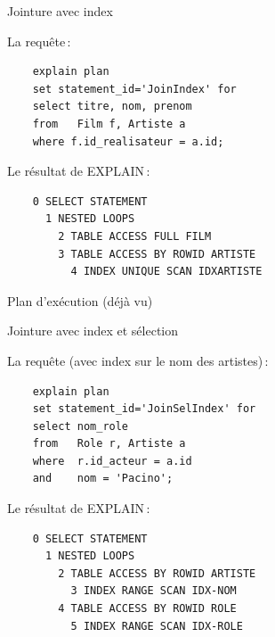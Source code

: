 \begin{frame}[fragile]{Jointure avec index}

La requête\,:

\begin{verbatim}
    explain plan 
    set statement_id='JoinIndex' for
    select titre, nom, prenom
    from   Film f, Artiste a
    where f.id_realisateur = a.id;
\end{verbatim}

\vfill

Le résultat de EXPLAIN\,:
\begin{verbatim}
    0 SELECT STATEMENT
      1 NESTED LOOPS
        2 TABLE ACCESS FULL FILM
        3 TABLE ACCESS BY ROWID ARTISTE
          4 INDEX UNIQUE SCAN IDXARTISTE
\end{verbatim}

\end{frame}


\begin{frame}{Plan d'exécution (déjà vu)}

\end{frame}

\begin{frame}[fragile]{Jointure avec index et sélection}

La requête (avec index sur le nom des artistes)\,:

\begin{verbatim}
    explain plan
    set statement_id='JoinSelIndex' for
    select nom_role
    from   Role r, Artiste a
    where  r.id_acteur = a.id
    and    nom = 'Pacino'; 
\end{verbatim}

\vfill

Le résultat de EXPLAIN\,:
\begin{verbatim}
    0 SELECT STATEMENT
      1 NESTED LOOPS
        2 TABLE ACCESS BY ROWID ARTISTE
          3 INDEX RANGE SCAN IDX-NOM
        4 TABLE ACCESS BY ROWID ROLE
          5 INDEX RANGE SCAN IDX-ROLE
\end{verbatim}

\end{frame}

